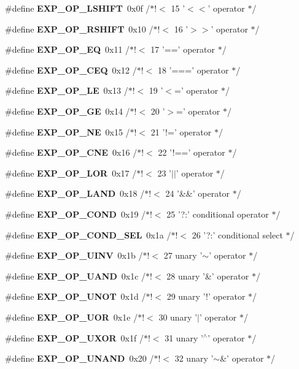 \begin{CompactItemize}
\item 
\#define {\bf EXP\_\-OP\_\-LSHIFT}\ 0x0f  /$\ast$!$<$ 15 '$<$$<$'  operator                $\ast$/
\item 
\#define {\bf EXP\_\-OP\_\-RSHIFT}\ 0x10  /$\ast$!$<$ 16 '$>$$>$'  operator                $\ast$/
\item 
\#define {\bf EXP\_\-OP\_\-EQ}\ 0x11  /$\ast$!$<$ 17 '=='  operator                $\ast$/
\item 
\#define {\bf EXP\_\-OP\_\-CEQ}\ 0x12  /$\ast$!$<$ 18 '===' operator                $\ast$/
\item 
\#define {\bf EXP\_\-OP\_\-LE}\ 0x13  /$\ast$!$<$ 19 '$<$='  operator                $\ast$/
\item 
\#define {\bf EXP\_\-OP\_\-GE}\ 0x14  /$\ast$!$<$ 20 '$>$='  operator                $\ast$/
\item 
\#define {\bf EXP\_\-OP\_\-NE}\ 0x15  /$\ast$!$<$ 21 '!='  operator                $\ast$/
\item 
\#define {\bf EXP\_\-OP\_\-CNE}\ 0x16  /$\ast$!$<$ 22 '!==' operator                $\ast$/
\item 
\#define {\bf EXP\_\-OP\_\-LOR}\ 0x17  /$\ast$!$<$ 23 '$|$$|$'  operator                $\ast$/
\item 
\#define {\bf EXP\_\-OP\_\-LAND}\ 0x18  /$\ast$!$<$ 24 '\&\&'  operator                $\ast$/
\item 
\#define {\bf EXP\_\-OP\_\-COND}\ 0x19  /$\ast$!$<$ 25 '?:' conditional operator     $\ast$/
\item 
\#define {\bf EXP\_\-OP\_\-COND\_\-SEL}\ 0x1a  /$\ast$!$<$ 26 '?:' conditional select       $\ast$/
\item 
\#define {\bf EXP\_\-OP\_\-UINV}\ 0x1b  /$\ast$!$<$ 27 unary '$\sim$'  operator           $\ast$/
\item 
\#define {\bf EXP\_\-OP\_\-UAND}\ 0x1c  /$\ast$!$<$ 28 unary '\&'  operator           $\ast$/
\item 
\#define {\bf EXP\_\-OP\_\-UNOT}\ 0x1d  /$\ast$!$<$ 29 unary '!'  operator           $\ast$/
\item 
\#define {\bf EXP\_\-OP\_\-UOR}\ 0x1e  /$\ast$!$<$ 30 unary '$|$'  operator           $\ast$/
\item 
\#define {\bf EXP\_\-OP\_\-UXOR}\ 0x1f  /$\ast$!$<$ 31 unary '$^\wedge$'  operator           $\ast$/
\item 
\#define {\bf EXP\_\-OP\_\-UNAND}\ 0x20  /$\ast$!$<$ 32 unary '$\sim$\&' operator           $\ast$/
\item 
$$
\end{CompactItemize}
